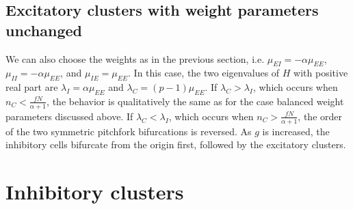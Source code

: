 \documentclass[11pt,reqno]{amsart}
\begin{document}
\subsection{Excitatory clusters with weight parameters unchanged}

We can also choose the weights as in the previous section, i.e. $\mu_{EI} = -\alpha \mu_{EE}$, $\mu_{II} = -\alpha \mu_{EE}$, and $\mu_{IE} = \mu_{EE}$. In this case, the two eigenvalues of $H$ with positive real part are $\lambda_I = \alpha \mu_{EE}$ and $\lambda_C = (p-1)\mu_{EE}$. If $\lambda_C > \lambda_I$, which occurs when $n_C < \frac{f N}{\alpha+1}$, the behavior is qualitatively the same as for the case balanced weight parameters discussed above. If  $\lambda_C < \lambda_I$, which occurs when $n_C > \frac{f N}{\alpha+1}$, the order of the two symmetric pitchfork bifurcations is reversed. As $g$ is increased, the inhibitory cells bifurcate from the origin first, followed by the excitatory clusters.

\section{Inhibitory clusters}
\end{document}
